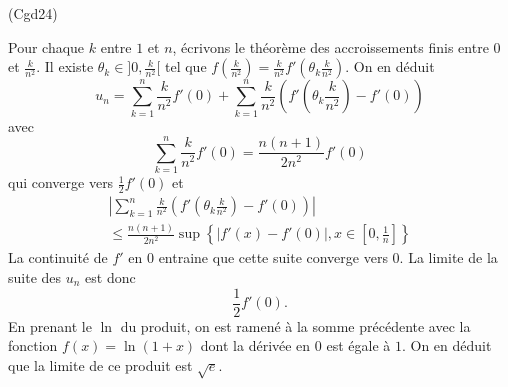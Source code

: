 \begin{tiny}(Cgd24)\end{tiny} Pour chaque $k$ entre $1$ et $n$, écrivons le théorème des accroissements finis entre $0$ et $\frac{k}{n^2}$. Il existe $\theta_k\in ]0,\frac{k}{n^2}[$ tel que $f(\frac{k}{n^2})=\frac{k}{n^2}f'(\theta_k \frac{k}{n^2})$. On en déduit
\begin{displaymath}
 u_n = \sum_{k=1}^n\frac{k}{n^2}f'(0)+\sum_{k=1}^n\frac{k}{n^2}\left(f'(\theta_k \frac{k}{n^2})- f'(0)\right) 
\end{displaymath}
avec
\begin{displaymath}
 \sum_{k=1}^n\frac{k}{n^2}f'(0) = \frac{n(n+1)}{2n^2}f'(0)
\end{displaymath}
qui converge vers $\frac{1}{2}f'(0)$ et
\begin{multline*}
 \left|\sum_{k=1}^n\frac{k}{n^2}\left(f'(\theta_k \frac{k}{n^2})- f'(0)\right)\right|\\
 \leq
\frac{n(n+1)}{2n^2} \sup\left\lbrace |f'(x)-f'(0)|, x\in [0,\frac{1}{n}]\right\rbrace 
\end{multline*}
La continuité de $f'$ en $0$ entraine que cette suite converge vers $0$. La limite de la suite des $u_n$ est donc
\begin{displaymath}
 \frac{1}{2}f'(0).
\end{displaymath}
En prenant le $\ln$ du produit, on est ramené à la somme précédente avec la fonction $f(x) = \ln(1+x)$ dont la dérivée en $0$ est égale à $1$. On en déduit que la limite de ce produit est $\sqrt{e}$.